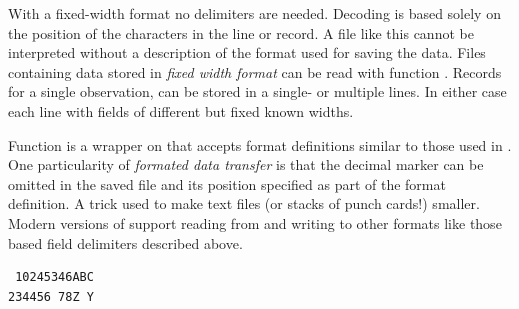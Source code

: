 \documentclass[krantz2]{krantz}\usepackage{knitr}%
\begin{document}
With a fixed-width format no delimiters are needed. Decoding is based solely on the position of the characters in the line or record. A file like this cannot be interpreted without a description of the format used for saving the data. Files containing data stored in \emph{fixed width format} can be read with function . Records for a single observation, can be stored in a single- or multiple lines. In either case each line with fields of different but fixed known widths.

Function  is a wrapper on  that accepts format definitions similar to those used in . One particularity of  \emph{formated data transfer} is that the decimal marker can be omitted in the saved file and its position specified as part of the format definition. A trick used to make text files (or stacks of punch cards!) smaller. Modern versions of  support reading from and writing to other formats like those based field delimiters described above.

\begin{knitrout}\footnotesize
{}\color{fgcolor}\begin{kframe}
\begin{verbatim}
 10245346ABC
234456 78Z Y
\end{verbatim}
\end{kframe}
\end{knitrout}

\begin{knitrout}\footnotesize
{}\color{fgcolor}\begin{kframe}
\begin{alltt}
 \hlkwb{<-} \hlstd{(}\hlstd{,}
                               \hlstd{=} \hlstd{(}\hlstd{,} \hlstd{,} \hlstd{),}
                               \hlstd{=} \hlstd{(}\hlstd{,} \hlstd{,} \hlstd{,} \hlstd{))}
\end{alltt}
\end{kframe}
\end{knitrout}
\end{document}
